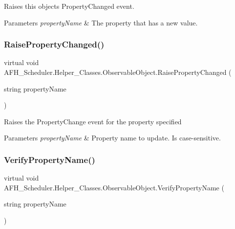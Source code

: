 Raises this object\textquotesingle{}s Property\+Changed event. 


\begin{DoxyParams}{Parameters}
{\em property\+Name} & The property that has a new value.\\
\hline
\end{DoxyParams}
\mbox{\label{class_a_f_h___scheduler_1_1_helper___classes_1_1_observable_object_a1aeecfa9800035629db7ca8d08322dc5}} 
\subsubsection{RaisePropertyChanged()}
{\footnotesize\ttfamily virtual void A\+F\+H\+\_\+\+Scheduler.\+Helper\+\_\+\+Classes.\+Observable\+Object.\+Raise\+Property\+Changed (\begin{DoxyParamCaption}\item[{string}]{property\+Name }\end{DoxyParamCaption})\hspace{0.3cm}{\ttfamily [virtual]}}



Raises the Property\+Change event for the property specified 


\begin{DoxyParams}{Parameters}
{\em property\+Name} & Property name to update. Is case-\/sensitive.\\
\hline
\end{DoxyParams}
\mbox{\label{class_a_f_h___scheduler_1_1_helper___classes_1_1_observable_object_ab8361d16e697573b81c84829a8d448cc}} 
\subsubsection{VerifyPropertyName()}
{\footnotesize\ttfamily virtual void A\+F\+H\+\_\+\+Scheduler.\+Helper\+\_\+\+Classes.\+Observable\+Object.\+Verify\+Property\+Name (\begin{DoxyParamCaption}\item[{string}]{property\+Name }\end{DoxyParamCaption})\hspace{0.3cm}{\ttfamily [virtual]}}



